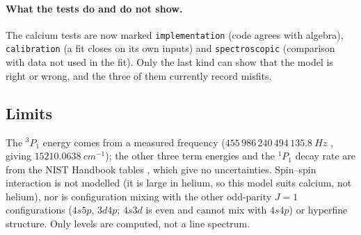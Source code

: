 \paragraph{What the tests do and do not show.} The calcium tests are now marked \texttt{implementation} (code agrees with algebra), \texttt{calibration} (a fit closes on its own inputs) and \texttt{spectroscopic} (comparison with data not used in the fit). Only the last kind can show that the model is right or wrong, and the three of them currently record misfits.

\subsection{Limits}
The $^3P_1$ energy comes from a measured frequency ($455\,986\,240\,494\,135.8\ \si{Hz}$ \cite{cafreq}, giving $15210.0638\ \si{cm^{-1}}$); the other three term energies and the $^1P_1$ decay rate are from the NIST Handbook tables \cite{nistca}, which give no uncertainties. Spin--spin interaction is not modelled
(it is large in helium, so this model suits calcium, not helium), nor is configuration mixing with the other odd-parity $J=1$ configurations ($4s5p$, $3d4p$; $4s3d$ is even and cannot mix with $4s4p$) or hyperfine structure. Only levels are computed, not a line spectrum.
